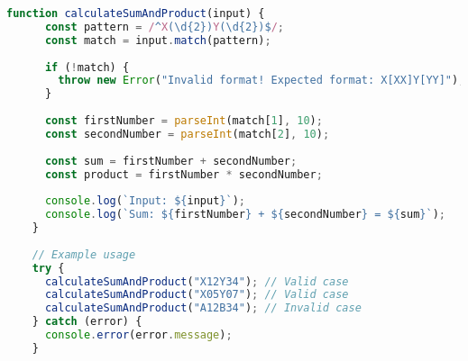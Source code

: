 \begin{lstlisting}[language=JavaScript, caption={$\texttt{Sample}$ procedure.}, label={lst:1}]
    function calculateSumAndProduct(input) {
      const pattern = /^X(\d{2})Y(\d{2})$/;
      const match = input.match(pattern);
    
      if (!match) {
        throw new Error("Invalid format! Expected format: X[XX]Y[YY]");
      }
    
      const firstNumber = parseInt(match[1], 10);
      const secondNumber = parseInt(match[2], 10);
    
      const sum = firstNumber + secondNumber;
      const product = firstNumber * secondNumber;
    
      console.log(`Input: ${input}`);
      console.log(`Sum: ${firstNumber} + ${secondNumber} = ${sum}`);
    }
    
    // Example usage
    try {
      calculateSumAndProduct("X12Y34"); // Valid case
      calculateSumAndProduct("X05Y07"); // Valid case
      calculateSumAndProduct("A12B34"); // Invalid case
    } catch (error) {
      console.error(error.message);
    }
    \end{lstlisting}